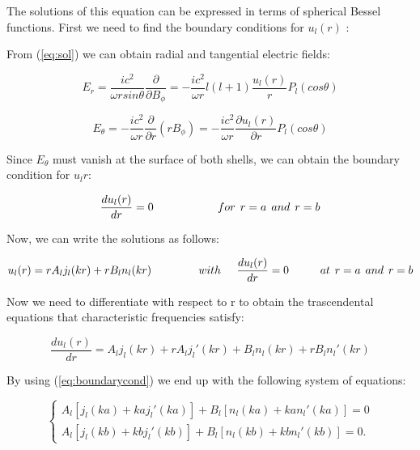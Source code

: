 \documentclass[a4paper,12pt]{article}
\newcommand{\es}{\hspace{0.15cm}}
\begin{document}
The solutions of this equation can be expressed in terms of spherical Bessel functions. First we need to find the boundary conditions for $u_l (r)$ : 

From (\ref{eq:sol}) we can obtain radial and tangential electric fields:

$$E_r = \frac{ic^2}{\omega r sin \theta}\frac{\partial }{\partial B_{\phi}} =- \frac{ic^2}{\omega r} l (l+1) \frac{u_l (r)}{r} P_l (cos \theta)$$

$$E_{\theta} = - \frac{ic^2}{\omega r} \frac{\partial}{\partial r} (r B_{\phi}) = - \frac{ic^2}{\omega r} \frac{\partial u_l (r)}{\partial r} P_l (cos \theta)$$

Since $E_{\theta}$ must vanish at the surface of both shells, we can obtain the boundary condition for $u_l r$: 

\begin{equation}
\frac{d u_l (r)}{dr} = 0 \hspace{2 cm} for \es r = a \es and \es r =b
\label{eq:boundarycond}
\end{equation}

Now, we can write the solutions as follows: 

\begin{equation}
u_l (r) = r A_l j_l(kr) + r B_l n_l(kr) \hspace{1.5cm} with \hspace{0.5cm} \frac{du_{l}(r)}{dr} = 0 \hspace{1cm} at \es r=a  \es and  \es r=b
\label{eq:sphericalbessel}
\end{equation}

Now we need to differentiate with respect to r to obtain the trascendental equations that characteristic frequencies satisfy: 

\begin{equation}
\frac{d u_l (r)}{dr} = A_l j_l (kr) + r A_l j_l \prime (kr) + B_l n_l(kr) + r B_l n_l \prime (kr)
\label{eq:boundarycharac}
\end{equation} 

By using (\ref{eq:boundarycond}) we end up with the following system of equations: 

\begin{equation}
    \begin{cases}
    A_l[j_l(ka) + ka j_l \prime(ka)] + B_l[n_l(ka) + ka n_l \prime (ka)] = 0\\
    A_l[j_l(kb) + kb j_l \prime(kb)] + B_l[n_l(kb) + kb n_l \prime (kb)] = 0.
  \end{cases}
\end{equation}
\end{document}
